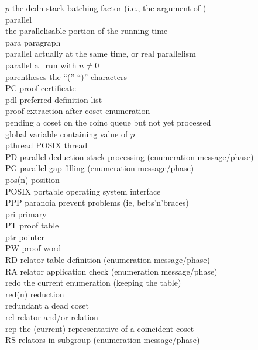 \begin{tabbing}
$p$        	\> the dedn stack batching factor (i.e., the argument of ) \\
\pace      	\> parallel \ace \\
  	\> the parallelisable portion of the running time \\
para       	\> paragraph \\
parallel   	\> actually at the same time, or real parallelism \\
parallel   	\> a \pace\ run with $n \ne 0$ \\
parentheses	\> the ``('' \amp ``)'' characters \\
PC         	\> proof certificate \\
pdl        	\> preferred definition list \\
\peace	   	\> proof extraction after coset enumeration \\
pending    	\> a coset on the coinc queue but not yet processed \\
	\> global variable containing value of $p$ \\
pthread    	\> POSIX thread \\
PD	   	\> parallel deduction stack processing (enumeration message/phase) \\
PG         	\> parallel gap-filling (enumeration message/phase) \\
pos(n)     	\> position \\
POSIX      	\> portable operating system interface \\
PPP        	\> paranoia prevent problems (ie, belts'n'braces) \\
pri	   	\> primary \\
PT         	\> proof table \\
ptr	   	\> pointer \\
PW	   	\> proof word \\
RD         	\> relator table definition (enumeration message/phase) \\
RA         	\> relator application check (enumeration message/phase) \\
	\> redo the current enumeration (keeping the table) \\
red(n)     	\> reduction \\
redundant  	\> a dead coset \\
rel	   	\> relator and/or relation \\
rep        	\> the (current) representative of a coincident coset \\
RS         	\> relators in subgroup (enumeration message/phase) \\

\end{tabbing}
